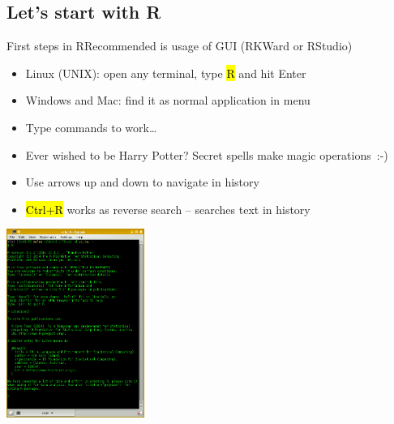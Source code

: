 \documentclass[compress, ucs, xelatex, 11pt, xcolor=svgnames,
  hyperref={
    bookmarks=true,
    unicode=true,
    colorlinks=true,
    pdftitle={Molecular data in R},
    plainpages=false,
    pdfauthor={Vojtech Zeisek},
    pdfsubject={Course about phylogeny and evolution in R},
    pdfcreator={XeLaTeX},
    pdfkeywords={R, evolution, phylogeny, molecular data},
    linkcolor=Tomato,
    anchorcolor=SaddleBrown,
    citecolor=Goldenrod,
    filecolor=DarkMagenta,
    menucolor=Sienna,
    urlcolor=DarkTurquoise,
    pdftex},
  url={hyphens, lowtilde} %
  ]{beamer}
\renewcommand{\texttt}[1]{\hl{\ttfamily #1}}
\begin{document}
\subsection{Let's start with R}

\begin{frame}{First steps in R}{Recommended is usage of GUI (RKWard or RStudio)}
\begin{multicols}{2}
  \begin{itemize}
    \item Linux (UNIX): open any terminal, type \texttt{R} and hit Enter
    \item Windows and Mac: find it as normal application in menu
    \item Type commands to work\ldots
    \item \alert{Ever wished to be Harry Potter? Secret spells make magic operations~:-)}
    \item Use arrows up and down to navigate in history
    \item \texttt{Ctrl+R} works as reverse search -- searches text in history
  \end{itemize}
  \columnbreak
  \includegraphics[width=4.5cm]{rkonsole.png}
\end{multicols}
\end{frame}
\end{document}
